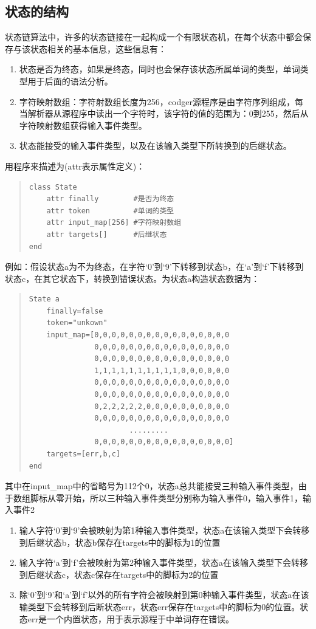 \subsection{状态的结构}
状态链算法中，许多的状态链接在一起构成一个有限状态机，在每个状态中都会保存与该状态相关的基本信息，这些信息有：
\begin{enumerate}
 \item 状态是否为终态，如果是终态，同时也会保存该状态所属单词的类型，单词类型用于后面的语法分析。
 \item 字符映射数组：字符射数组长度为256，codger源程序是由字符序列组成，每当解析器从源程序中读出一个字符时，该字符的值的范围为：0到255，然后从字符映射数组获得输入事件类型。
 \item 状态能接受的输入事件类型，以及在该输入类型下所转换到的后继状态。
\end{enumerate}
用程序来描述为(attr表示属性定义)：
\begin{quote}
 \begin{verbatim}
class State
    attr finally        #是否为终态
    attr token          #单词的类型
    attr input_map[256] #字符映射数组
    attr targets[]      #后继状态
end
 \end{verbatim}
\end{quote}
例如：假设状态a为不为终态，在字符`0'到`9'下转移到状态b，在`a'到`f'下转移到状态c，在其它状态下，转换到错误状态。为状态a构造状态数据为：
\begin{quote}
 \begin{verbatim}
State a
    finally=false
    token="unkown"
    input_map=[0,0,0,0,0,0,0,0,0,0,0,0,0,0,0,0
               0,0,0,0,0,0,0,0,0,0,0,0,0,0,0,0
               0,0,0,0,0,0,0,0,0,0,0,0,0,0,0,0
               1,1,1,1,1,1,1,1,1,1,0,0,0,0,0,0
               0,0,0,0,0,0,0,0,0,0,0,0,0,0,0,0
               0,0,0,0,0,0,0,0,0,0,0,0,0,0,0,0
               0,2,2,2,2,2,0,0,0,0,0,0,0,0,0,0
               0,0,0,0,0,0,0,0,0,0,0,0,0,0,0,0
                       .........
               0,0,0,0,0,0,0,0,0,0,0,0,0,0,0,0]
    targets=[err,b,c]
end  
 \end{verbatim}
\end{quote}

其中在input\_map中的省略号为112个0，状态a总共能接受三种输入事件类型，由于数组脚标从零开始，所以三种输入事件类型分别称为输入事件0，输入事件1，输入事件2
\begin{enumerate}
 \item 输人字符`0'到`9'会被映射为第1种输入事件类型，状态a在该输入类型下会转移到后继状态b，状态b保存在targets中的脚标为1的位置
 \item 输入字符`a'到`f'会被映射为第2种输入事件类型，状态a在该输入类型下会转移到后继状态c，状态c保存在targets中的脚标为2的位置
 \item 除`0'到`9'和`a'到`f'以外的所有字符会被映射到第0种输入事件类型，状态a在该输类型下会转移到后断状态err，状态err保存在targets中的脚标为0的位置。状态err是一个内置状态，用于表示源程于中单词存在错误。
\end{enumerate}

